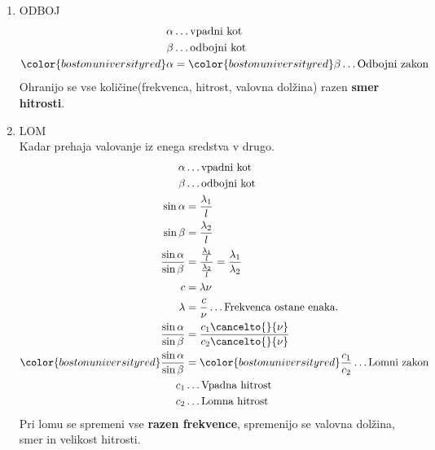 \begin{enumerate}
	\item ODBOJ\\
		\begin{align*}
			\alpha &\dots \text{vpadni kot}\\
			\beta &\dots \text{odbojni kot}\\
			{\color{bostonuniversityred}\alpha} &= {\color{bostonuniversityred}\beta} \dots \text{Odbojni zakon}\\
		\end{align*}
		Ohranijo se vse količine(frekvenca, hitrost, valovna dolžina) razen \textbf{smer hitrosti}.\\
	\item LOM\\
		Kadar prehaja valovanje iz enega sredstva v drugo.\\
		\begin{align*}
			\alpha &\dots \text{vpadni kot}\\
			\beta &\dots \text{odbojni kot}\\
			\sin\alpha &= \frac{\lambda_1}{l}\\
			\sin\beta &= \frac{\lambda_2}{l}\\
			\frac{\sin\alpha}{\sin\beta} &= \frac{\frac{\lambda_1}{l}}{\frac{\lambda_2}{l}} = \frac{\lambda_1}{\lambda_2}\\
			c &= \lambda \nu\\
			\lambda &= \frac{c}{\nu} \dots \text{Frekvenca ostane enaka.}\\
			\frac{\sin\alpha}{\sin\beta} &= \frac{c_1 \cancelto{}{\nu}}{c_2 \cancelto{}{\nu}}\\
			{\color{bostonuniversityred}\frac{\sin\alpha}{\sin\beta}} &= {\color{bostonuniversityred}\frac{c_1}{c_2}} \dots \text{Lomni zakon}\\
			c_1 &\dots \text{Vpadna hitrost}\\
			c_2 &\dots \text{Lomna hitrost}\\
		\end{align*}
		Pri lomu se spremeni vse \textbf{razen frekvence}, spremenijo se valovna dolžina, smer in velikost hitrosti.\\

\end{enumerate}
